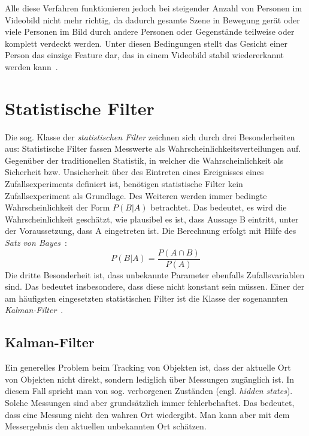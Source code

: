\documentclass[a4paper, 11pt, twocolumn]{article}
\begin{document}
Alle diese Verfahren funktionieren jedoch bei steigender Anzahl von Personen im Videobild nicht mehr richtig, da dadurch gesamte Szene in Bewegung gerät oder viele Personen im Bild durch andere Personen oder Gegenstände teilweise oder komplett verdeckt werden. Unter diesen Bedingungen stellt das Gesicht einer Person das einzige Feature dar, das in einem Videobild stabil wiedererkannt werden kann~\cite{aliMultipleHuman}.


\section{Statistische Filter} %
\label{sec:statistische_filter}

Die sog. Klasse der \emph{statistischen Filter} zeichnen sich durch drei Besonderheiten aus: Statistische Filter fassen Messwerte als Wahrscheinlichkeitsverteilungen auf. Gegenüber der traditionellen Statistik, in welcher die Wahrscheinlichkeit als Sicherheit bzw. Unsicherheit über des Eintreten eines Ereignisses eines Zufallsexperiments definiert ist, benötigen statistische Filter kein Zufallsexperiment als Grundlage. 
Des Weiteren werden immer bedingte Wahrscheinlichkeit der Form $P(B|A)$ betrachtet. Das bedeutet, es wird die Wahrscheinlichkeit geschätzt, wie plausibel es ist, dass Aussage B eintritt, unter der Voraussetzung, dass A eingetreten ist. Die Berechnung erfolgt mit Hilfe des \emph{Satz von Bayes}~\cite{PapulaFormelsammlung2001}:
\[
	P(B|A) = \frac{P(A \cap B)}{P(A)}
\]
Die dritte Besonderheit ist, dass unbekannte Parameter ebenfalls Zufallsvariablen sind. Das bedeutet insbesondere, dass diese nicht konstant sein müssen.
Einer der am häufigsten eingesetzten statistischen Filter ist die Klasse der sogenannten \emph{Kalman-Filter}~\cite{MarslandBook}.


\subsection{Kalman-Filter} %
\label{sub:kalman_filter}

Ein generelles Problem beim Tracking von Objekten ist, dass der aktuelle Ort von Objekten nicht direkt, sondern lediglich über Messungen zugänglich ist. In diesem Fall spricht man von sog. verborgenen Zuständen (engl. \emph{hidden states}). Solche Messungen sind aber grundsätzlich immer fehlerbehaftet. Das bedeutet, dass eine Messung nicht den wahren Ort wiedergibt. Man kann aber mit dem Messergebnis den aktuellen unbekannten Ort schätzen.
\end{document}
